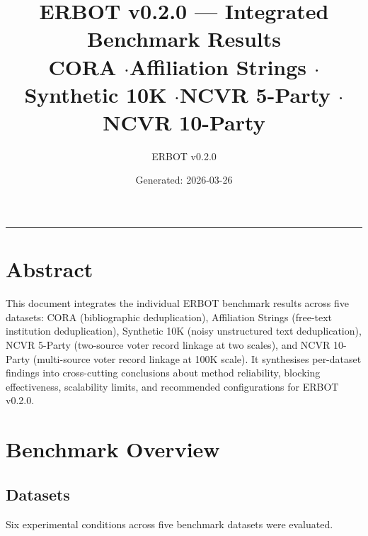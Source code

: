 \documentclass[11pt, a4paper]{article}
\title{\textbf{ERBOT v0.2.0 --- Integrated Benchmark Results}\\[6pt]
       \large CORA \quad$\cdot$\quad Affiliation Strings \quad$\cdot$\quad
              Synthetic 10K \quad$\cdot$\quad NCVR 5-Party \quad$\cdot$\quad NCVR 10-Party}
\author{ERBOT v0.2.0}
\date{Generated: 2026-03-26}
\begin{document}
\maketitle
\tableofcontents
\vspace{1em}
\hrule
\vspace{1em}

\section*{Abstract}

This document integrates the individual ERBOT benchmark results across five
datasets: CORA (bibliographic deduplication), Affiliation Strings (free-text
institution deduplication), Synthetic 10K (noisy unstructured text
deduplication), NCVR 5-Party (two-source voter record linkage at two scales),
and NCVR 10-Party (multi-source voter record linkage at 100K scale). It
synthesises per-dataset findings into cross-cutting conclusions about method
reliability, blocking effectiveness, scalability limits, and recommended
configurations for ERBOT v0.2.0.

\section{Benchmark Overview}

\subsection{Datasets}

Six experimental conditions across five benchmark datasets were evaluated.
\end{document}
